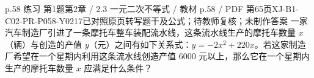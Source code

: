 \par\noindent\begin{minipage}{\linewidth}
\begin{bankitem}{p.58 练习 第1题}{第2章 / 2.3 一元二次不等式 / 教材 p.58 / PDF 第65页}{XJ-B1-C02-PR-P058-Y0217}{已对照原页转写题干及公式；待教师复核；未制作答案}
一家汽车制造厂引进了一条摩托车整车装配流水线，这条流水线生产的摩托车数量 $x$（辆）与创造的产值 $y$（元）之间有如下关系式：$y=-2x^2+220x$。若这家制造厂希望在一个星期内利用这条流水线创造产值 6000 元以上，那么它在一个星期内生产的摩托车数量 $x$ 应满足什么条件？
\end{bankitem}
\end{minipage}\par\medskip
